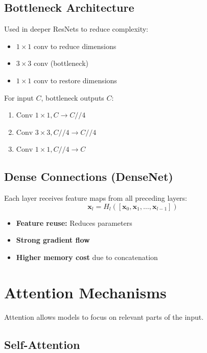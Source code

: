 \subsection{Bottleneck Architecture}

Used in deeper ResNets to reduce complexity:
\begin{itemize}
    \item $1\times1$ conv to reduce dimensions
    \item $3\times3$ conv (bottleneck)
    \item $1\times1$ conv to restore dimensions
\end{itemize}

For input $C$, bottleneck outputs $C$:
\begin{enumerate}
    \item $\text{Conv }1\times1, C \rightarrow C//4$
    \item $\text{Conv }3\times3, C//4 \rightarrow C//4$
    \item $\text{Conv }1\times1, C//4 \rightarrow C$
\end{enumerate}

\subsection{Dense Connections (DenseNet)}

Each layer receives feature maps from all preceding layers:
\begin{equation}
\mathbf{x}_l = H_l([\mathbf{x}_0, \mathbf{x}_1, \ldots, \mathbf{x}_{l-1}])
\end{equation}

\begin{itemize}
    \item \textbf{Feature reuse:} Reduces parameters
    \item \textbf{Strong gradient flow}
    \item \textbf{Higher memory cost} due to concatenation
\end{itemize}

\section{Attention Mechanisms}

Attention allows models to focus on relevant parts of the input.

\subsection{Self-Attention}

